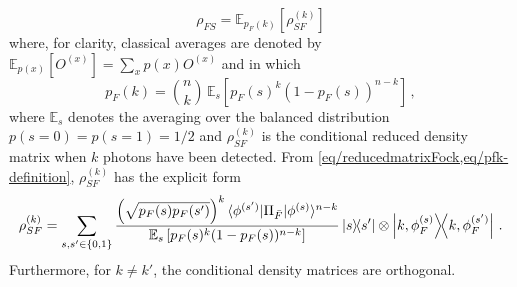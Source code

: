 \begin{equation}
	\rho_{FS}=\mathbb{E}_{p_F(k)}\left[ \rho_{SF}^{(k)}\right]
\end{equation}
where, for clarity, classical averages are denoted by
$\mathbb{E}_{p(x)} \left[O^{(x)}\right] = \sum_x p(x) O^{(x)}$ 
and in which
\begin{equation}
	\label{eq/pfk-definition}
p_F(k) = \binom{n}{k}\,
	\mathbb{E}_{s}\left[ p_F(s)^k
	(1-p_F(s))^{n-k}
	\right]\, ,
\end{equation}
where $\mathbb{E}_s$ denotes the averaging over the balanced
distribution $p(s=0)=p(s=1)=1/2$
and $\rho_{SF}^{(k)}$ is the conditional reduced density matrix when
$k$ photons have been detected. From \cref{eq/reducedmatrixFock,eq/pfk-definition},
$\rho_{SF}^{(k)}$ has the explicit form
%
\begin{align}
\rho_{SF}^{(k)} = 
\sum_{s,s' \in\lbrace 0,1 \rbrace} 
	\frac{\left(\sqrt{p_F(s)p_F(s')}\right)^k 
	\langle \phi^{(s')} | \Pi_{\bar{F}} | \phi^{(s)} \rangle^{n-k}}{
	\mathbb{E}_s\left[ p_F(s)^k(1-p_F(s))^{n-k}\right]}
	\ketbra{s}{s'}
\otimes	\ketbra{k,\phi^{(s)}_F}{k,\phi^{(s')}_F}\,.
\end{align}
Furthermore, for $k \ne k'$, the conditional
density matrices are orthogonal.

